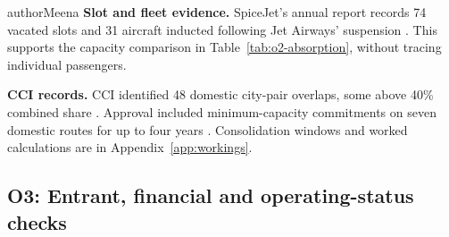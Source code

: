 \begin{mergedcontribution}{authorMeena}
\textbf{Slot and fleet evidence.} SpiceJet's annual report records 74 vacated slots and 31 aircraft inducted following Jet Airways' suspension \parencite[p.~62]{spicejet2020annual}. This supports the capacity comparison in Table~\ref{tab:o2-absorption}, without tracing individual passengers.

\textbf{CCI records.} CCI identified 48 domestic city-pair overlaps, some above 40\% combined share \parencite[paras.~19, 109--111]{cci2023vistara}. Approval included minimum-capacity commitments on seven domestic routes for up to four years \parencite[paras.~115--118, 126--127]{cci2023vistara}. Consolidation windows and worked calculations are in Appendix~\ref{app:workings}.
\end{mergedcontribution}
\subsection{O3: Entrant, financial and operating-status checks}
\label{app:o3-support}
\label{app:results-o3}
